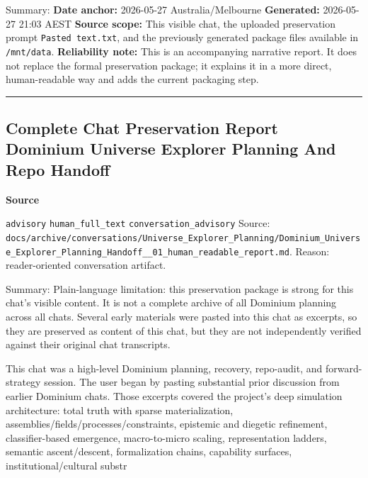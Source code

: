 \documentclass[9pt,a4paper,openany]{book}
\newcommand{\vonecallout}[3]{\par\medskip\noindent\begingroup\setlength{\fboxsep}{7pt}\colorbox{DomCalloutBg}{\parbox{0.94\linewidth}{\textbf{\textcolor{#1}{#2}}\par #3}}\endgroup\par\medskip}
\begin{document}
Summary: \textbf{Date anchor:} 2026-\allowbreak{}05-\allowbreak{}27 Australia/\allowbreak{}Melbourne \textbf{Generated:} 2026-\allowbreak{}05-\allowbreak{}27 21:03 AEST \textbf{Source scope:} This visible chat, the uploaded preservation prompt \texttt{Pasted text.\allowbreak{}txt}, and the previously generated package files available in \texttt{/\allowbreak{}mnt/\allowbreak{}data}.\allowbreak{} \textbf{Reliability note:} This is an accompanying narrative report.\allowbreak{} It does not replace the formal preservation package; it explains it in a more direct, human-\allowbreak{}readable way and adds the current packaging step.\allowbreak{}


\par\medskip\hrule\medskip


\subsection{Complete Chat Preservation Report Dominium Universe Explorer Planning And Repo Handoff}

\vonecallout{DomSlate}{Source}{\texttt{advisory} \texttt{human\_\allowbreak{}full\_\allowbreak{}text} \texttt{conversation\_\allowbreak{}advisory} Source: \texttt{docs/\allowbreak{}archive/\allowbreak{}conversations/\allowbreak{}Universe\_\allowbreak{}Explorer\_\allowbreak{}Planning/\allowbreak{}Dominium\_\allowbreak{}Universe\_\allowbreak{}Explorer\_\allowbreak{}Planning\_\allowbreak{}Handoff\_\allowbreak{}\_\allowbreak{}01\_\allowbreak{}human\_\allowbreak{}readable\_\allowbreak{}report.\allowbreak{}md}.\allowbreak{} Reason: reader-\allowbreak{}oriented conversation artifact.\allowbreak{}}

Summary: Plain-\allowbreak{}language limitation: this preservation package is strong for this chat's visible content.\allowbreak{} It is not a complete archive of all Dominium planning across all chats.\allowbreak{} Several early materials were pasted into this chat as excerpts, so they are preserved as content of this chat, but they are not independently verified against their original chat transcripts.\allowbreak{}


This chat was a high-\allowbreak{}level Dominium planning, recovery, repo-\allowbreak{}audit, and forward-\allowbreak{}strategy session.\allowbreak{} The user began by pasting substantial prior discussion from earlier Dominium chats.\allowbreak{} Those excerpts covered the project's deep simulation architecture: total truth with sparse materialization, assemblies/\allowbreak{}fields/\allowbreak{}processes/\allowbreak{}constraints, epistemic and diegetic refinement, classifier-\allowbreak{}based emergence, macro-\allowbreak{}to-\allowbreak{}micro scaling, representation ladders, semantic ascent/\allowbreak{}descent, formalization chains, capability surfaces, institutional/\allowbreak{}cultural substr
\end{document}
